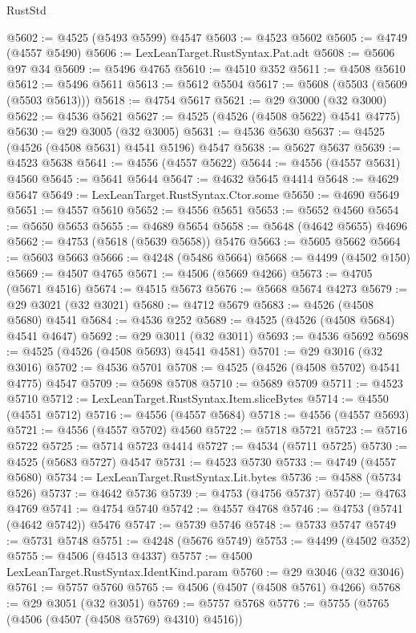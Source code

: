 \begin{lexlean}{RustStd}
\begin{coremodule}
@5602 := @4525 (@5493 @5599) @4547
@5603 := @4523 @5602
@5605 := @4749 (@4557 @5490)
@5606 := LexLeanTarget.RustSyntax.Pat.adt
@5608 := @5606 @97 @34
@5609 := @5496 @4765
@5610 := @4510 @352
@5611 := @4508 @5610
@5612 := @5496 @5611
@5613 := @5612 @5504
@5617 := @5608 (@5503 (@5609 (@5503 @5613)))
@5618 := @4754 @5617
@5621 := @29 @3000 (@32 @3000)
@5622 := @4536 @5621
@5627 := @4525 (@4526 (@4508 @5622) @4541 @4775)
@5630 := @29 @3005 (@32 @3005)
@5631 := @4536 @5630
@5637 := @4525 (@4526 (@4508 @5631) @4541 @5196) @4547
@5638 := @5627 @5637
@5639 := @4523 @5638
@5641 := @4556 (@4557 @5622)
@5644 := @4556 (@4557 @5631) @4560
@5645 := @5641 @5644
@5647 := @4632 @5645 @4414
@5648 := @4629 @5647
@5649 := LexLeanTarget.RustSyntax.Ctor.some
@5650 := @4690 @5649
@5651 := @4557 @5610
@5652 := @4556 @5651
@5653 := @5652 @4560
@5654 := @5650 @5653
@5655 := @4689 @5654
@5658 := @5648 (@4642 @5655) @4696
@5662 := @4753 (@5618 (@5639 @5658)) @5476
@5663 := @5605 @5662
@5664 := @5603 @5663
@5666 := @4248 (@5486 @5664)
@5668 := @4499 (@4502 @150)
@5669 := @4507 @4765
@5671 := @4506 (@5669 @4266)
@5673 := @4705 (@5671 @4516)
@5674 := @4515 @5673
@5676 := @5668 @5674 @4273
@5679 := @29 @3021 (@32 @3021)
@5680 := @4712 @5679
@5683 := @4526 (@4508 @5680) @4541
@5684 := @4536 @252
@5689 := @4525 (@4526 (@4508 @5684) @4541 @4647)
@5692 := @29 @3011 (@32 @3011)
@5693 := @4536 @5692
@5698 := @4525 (@4526 (@4508 @5693) @4541 @4581)
@5701 := @29 @3016 (@32 @3016)
@5702 := @4536 @5701
@5708 := @4525 (@4526 (@4508 @5702) @4541 @4775) @4547
@5709 := @5698 @5708
@5710 := @5689 @5709
@5711 := @4523 @5710
@5712 := LexLeanTarget.RustSyntax.Item.sliceBytes
@5714 := @4550 (@4551 @5712)
@5716 := @4556 (@4557 @5684)
@5718 := @4556 (@4557 @5693)
@5721 := @4556 (@4557 @5702) @4560
@5722 := @5718 @5721
@5723 := @5716 @5722
@5725 := @5714 @5723 @4414
@5727 := @4534 (@5711 @5725)
@5730 := @4525 (@5683 @5727) @4547
@5731 := @4523 @5730
@5733 := @4749 (@4557 @5680)
@5734 := LexLeanTarget.RustSyntax.Lit.bytes
@5736 := @4588 (@5734 @526)
@5737 := @4642 @5736
@5739 := @4753 (@4756 @5737)
@5740 := @4763 @4769
@5741 := @4754 @5740
@5742 := @4557 @4768
@5746 := @4753 (@5741 (@4642 @5742)) @5476
@5747 := @5739 @5746
@5748 := @5733 @5747
@5749 := @5731 @5748
@5751 := @4248 (@5676 @5749)
@5753 := @4499 (@4502 @352)
@5755 := @4506 (@4513 @4337)
@5757 := @4500 LexLeanTarget.RustSyntax.IdentKind.param
@5760 := @29 @3046 (@32 @3046)
@5761 := @5757 @5760
@5765 := @4506 (@4507 (@4508 @5761) @4266)
@5768 := @29 @3051 (@32 @3051)
@5769 := @5757 @5768
@5776 := @5755 (@5765 (@4506 (@4507 (@4508 @5769) @4310) @4516))

\end{coremodule}
\end{lexlean}
